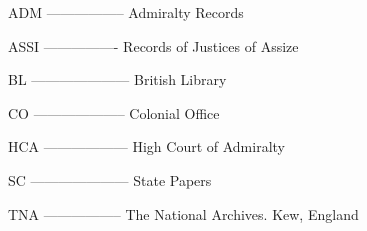\addchap{\lsAbbreviationsTitle}

ADM -----------------  Admiralty Records

ASSI ----------------  Records of Justices of Assize

BL ---------------------  British Library

CO --------------------  Colonial Office

HCA ------------------  High Court of Admiralty

SC ---------------------  State Papers

TNA -----------------  The National Archives. Kew, England